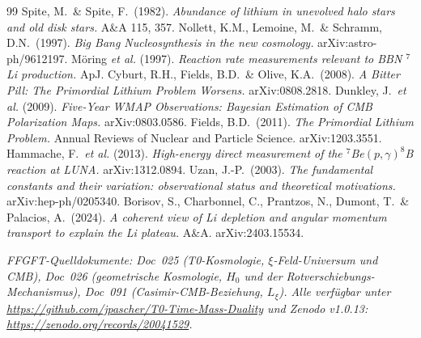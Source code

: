 \documentclass[11pt,a4paper]{article}
\begin{document}
\noindent\small
\begin{thebibliography}{99}
 Spite, M.\ \& Spite, F.\ (1982). \emph{Abundance of lithium in unevolved halo stars and old disk stars.} A\&A 115, 357.
 Nollett, K.M., Lemoine, M.\ \& Schramm, D.N.\ (1997). \emph{Big Bang Nucleosynthesis in the new cosmology.} arXiv:astro-ph/9612197.
 Möring \emph{et al.} (1997). \emph{Reaction rate measurements relevant to BBN $^7$Li production.} ApJ.
 Cyburt, R.H., Fields, B.D.\ \& Olive, K.A.\ (2008). \emph{A Bitter Pill: The Primordial Lithium Problem Worsens.} arXiv:0808.2818.
 Dunkley, J.\ \emph{et al.} (2009). \emph{Five-Year WMAP Observations: Bayesian Estimation of CMB Polarization Maps.} arXiv:0803.0586.
 Fields, B.D.\ (2011). \emph{The Primordial Lithium Problem.} Annual Reviews of Nuclear and Particle Science. arXiv:1203.3551.
 Hammache, F.\ \emph{et al.} (2013). \emph{High-energy direct measurement of the $^7$Be$(p,\gamma)^8$B reaction at LUNA.} arXiv:1312.0894.
 Uzan, J.-P.\ (2003). \emph{The fundamental constants and their variation: observational status and theoretical motivations.} arXiv:hep-ph/0205340.
 Borisov, S., Charbonnel, C., Prantzos, N., Dumont, T.\ \& Palacios, A.\ (2024). \emph{A coherent view of Li depletion and angular momentum transport to explain the Li plateau.} A\&A. arXiv:2403.15534.
\end{thebibliography}

\medskip
\noindent\emph{FFGFT-Quelldokumente: Doc~025 (T0-Kosmologie, $\xi$-Feld-Universum und CMB), Doc~026 (geometrische Kosmologie, $H_0$ und der Rotverschiebungs-Mechanismus), Doc~091 (Casimir-CMB-Beziehung, $L_\xi$). Alle verfügbar unter \url{https://github.com/jpascher/T0-Time-Mass-Duality} und Zenodo v1.0.13: \url{https://zenodo.org/records/20041529}.}
\end{document}
